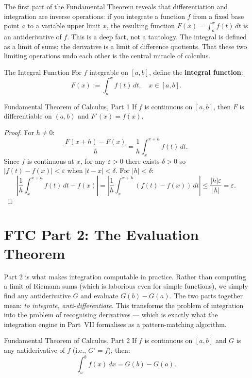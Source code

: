 \documentclass[12pt, openany]{book}
\theoremstyle{plain}
\theoremstyle{definition}
\theoremstyle{remark}
\newcommand{\eps}{\varepsilon}
\newcommand{\del}{\delta}
\begin{document}
The first part of the Fundamental Theorem reveals that differentiation and integration are inverse operations: if you integrate a function $f$ from a fixed base point $a$ to a variable upper limit $x$, the resulting function $F(x) = \int_a^x f(t)\,dt$ is an antiderivative of $f$.  This is a deep fact, not a tautology.  The integral is defined as a limit of sums; the derivative is a limit of difference quotients.  That these two limiting operations undo each other is the central miracle of calculus.

\begin{defbox}{The Integral Function}
For $f$ integrable on $[a,b]$, define the \textbf{integral function}:
\[ F(x) := \int_a^x f(t)\,dt, \quad x \in [a,b]. \]
\end{defbox}
\color{black}

\begin{thmbox}{Fundamental Theorem of Calculus, Part 1}
If $f$ is continuous on $[a,b]$, then $F$ is differentiable on $(a,b)$ and $F'(x) = f(x)$.
\end{thmbox}
\color{black}

\begin{proof}
For $h \neq 0$:
\[ \frac{F(x+h) - F(x)}{h} = \frac{1}{h}\int_x^{x+h} f(t)\,dt. \]
Since $f$ is continuous at $x$, for any $\eps > 0$ there exists $\del > 0$ so $|f(t) - f(x)| < \eps$ when $|t - x| < \del$. For $|h| < \del$:
\[ \left|\frac{1}{h}\int_x^{x+h} f(t)\,dt - f(x)\right| = \left|\frac{1}{h}\int_x^{x+h}(f(t) - f(x))\,dt\right| \leq \frac{|h|\eps}{|h|} = \eps. \]
\end{proof}

\section{FTC Part 2: The Evaluation Theorem}

Part 2 is what makes integration computable in practice.  Rather than computing a limit of Riemann sums (which is laborious even for simple functions), we simply find any antiderivative $G$ and evaluate $G(b) - G(a)$.  The two parts together mean: \emph{to integrate, anti-differentiate}.  This transforms the problem of integration into the problem of recognising derivatives --- which is exactly what the integration engine in Part~VII formalises as a pattern-matching algorithm.

\begin{thmbox}{Fundamental Theorem of Calculus, Part 2}
If $f$ is continuous on $[a,b]$ and $G$ is any antiderivative of $f$ (i.e., $G' = f$), then:
\[ \int_a^b f(x)\,dx = G(b) - G(a). \]
\end{thmbox}
\color{black}
\end{document}
